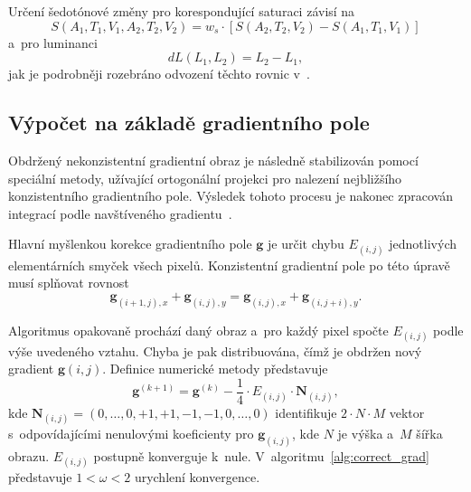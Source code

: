 \documentclass[11pt,a4paper,oneside]{article}
\begin{document}
	Určení šedotónové změny pro korespondující saturaci závisí na
	\begin{equation}
		S(A_1, T_1, V_1, A_2, T_2, V_2) = w_s \cdot \left[S(A_2, T_2, V_2) - S(A_1, T_1, V_1)\right]
		\label{eq:sat}
	\end{equation}
	a~pro luminanci
	\begin{equation}
		dL(L_1, L_2) = L_2 - L_1,
		\label{eq:lum}
	\end{equation}
	jak je podrobněji rozebráno odvození těchto rovnic v~\cite{cadik08phd}.

	\subsection{Výpočet na základě gradientního pole}
	Obdržený nekonzistentní gradientní obraz je následně stabilizován pomocí speciální metody, užívající
	ortogonální projekci pro nalezení nejbližšího konzistentního gradientního pole. Výsledek
	tohoto procesu je nakonec zpracován integrací podle navštíveného gradientu~\cite{cadik07color_to_gray}.

	Hlavní myšlenkou korekce gradientního pole $\mathbf{g}$ je určit chybu $E_{(i, j)}$
	jednotlivých elementárních smyček všech pixelů. Konzistentní gradientní pole po
	této úpravě musí splňovat rovnost
	$$
		\mathbf{g}_{(i + 1, j), x} + \mathbf{g}_{(i, j), y} =
		\mathbf{g}_{(i, j), x} + \mathbf{g}_{(i, j + i), y}.
	$$

	Algoritmus opakovaně prochází daný obraz a~pro každý pixel spočte $E_{(i, j)}$ podle výše uvedeného
	vztahu. Chyba je pak distribuována, čímž je obdržen nový gradient $\mathbf{g}(i, j)$. Definice
	numerické metody představuje
	\begin{equation}
		\mathbf{g}^{(k + 1)} = \mathbf{g}^{(k)} - \frac{1}{4} \cdot E_{(i, j)} \cdot \mathbf{N}_{(i, j)},
	\end{equation}
	kde $\mathbf{N}_{(i, j)} = (0, \dots, 0, +1, +1, -1, -1, 0, \dots, 0)$ identifikuje $2 \cdot
	N \cdot M$ vektor s~odpovídajícími nenulovými koeficienty pro $\mathbf{g}_{(i,j)}$, kde $N$
	je výška a~$M$ šířka obrazu. $E_{(i, j)}$ postupně konverguje k~nule. V~algoritmu~\ref{alg:correct_grad}
	představuje $1 < \omega < 2$ urychlení konvergence.
\end{document}
